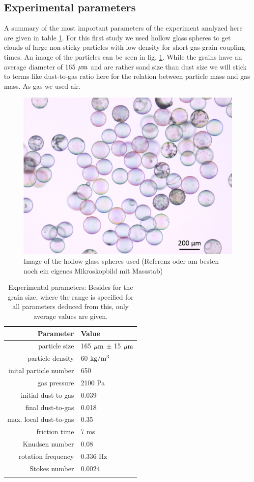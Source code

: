 \subsection{Experimental parameters}


A summary of the most important parameters of the experiment analyzed here are given in table \ref{para}.
For this first study we used hollow glass spheres to get clouds of large non-sticky particles with low density for short gas-grain coupling times. An image of the particles can be seen in
fig. \ref{fig.hollow}. While the grains have an average diameter of 165 $\rm \mu m$ and are rather sand size than dust size we will stick to terms like dust-to-gas ratio here for the relation between particle mass and gas mass. As gas we used air.

\begin{figure}[h]
\includegraphics[width=\columnwidth]{hollow.png}
    \caption{\label{fig.hollow} Image of the hollow glass spheres used (Referenz
    oder am besten noch ein eigenes Mikroskopbild mit Massstab)}
\end{figure}

\begin{table}
\centering
\caption{Experimental parameters: Besides for the grain size, where the range is specified for all parameters deduced from this, only average values are given.}
\begin{tabular}{r|l}
Parameter&Value\\
\hline
particle size&165 $\rm \mu m$  $\pm$ 15 $\rm \mu m$\\
particle density&60 $\rm kg / m^3$ \\
inital particle number& 650\\
gas pressure&2100 Pa\\
initial dust-to-gas& 0.039 \\
final dust-to-gas& 0.018 \\
max. local dust-to-gas & 0.35 \\ 
friction time&7 ms\\
Knudsen number&0.08\\
rotation frequency& 0.336 Hz\\
Stokes number&0.0024\\
\label{para}
\end{tabular}
\end{table}

